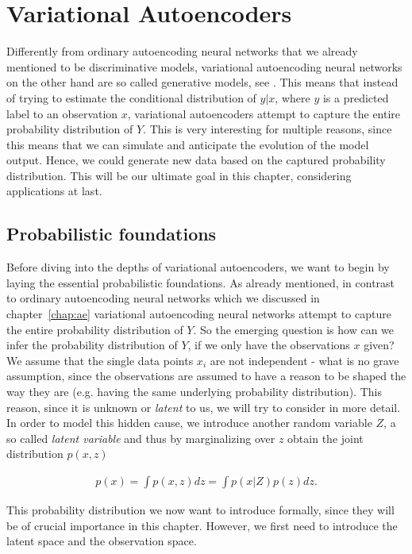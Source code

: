 \chapter{Variational Autoencoders}\label{chap:vae}

Differently from ordinary autoencoding neural networks that we already mentioned to be discriminative models, variational autoencoding neural networks on the other hand are so called generative models, see \cite[chapter~5]{cinelli2021variational}. This means that instead of trying to estimate the conditional distribution of $y|x$, where $y$ is a predicted label to an observation $x$, variational autoencoders attempt to capture the entire probability distribution of $Y$. This is very interesting for multiple reasons, since this means that we can simulate and anticipate the evolution of the model output. Hence, we could generate new data based on the captured probability distribution. This will be our ultimate goal in this chapter, considering applications at last.

\section{Probabilistic foundations}

Before diving into the depths of variational autoencoders, we want to begin by laying the essential probabilistic foundations. As already mentioned, in contrast to ordinary autoencoding neural networks which we discussed in chapter~\ref{chap:ae}
variational autoencoding neural networks attempt to capture the entire probability distribution of $Y$. So the emerging question is how can we infer the probability distribution of $Y$, if we only have the observations $x$ given? We assume that the single data points $x_i$ are not independent - what is no grave assumption, since the observations are assumed to have a reason to be shaped the way they are (e.g. having the same underlying probability distribution). This reason, since it is unknown or \textit{latent} to us, we will try to consider in more detail. In order to model this hidden cause, we introduce another random variable $Z$, a so called \textit{latent variable} and thus by marginalizing over $z$ obtain the joint distribution $p(x,z)$

\begin{align}\label{eq:evidence}
p(x) = \int p(x,z) dz = \int p(x|Z)p(z)dz.
\end{align}

This probability distribution we now want to introduce formally, since they will be of crucial importance in this chapter. However, we first need to introduce the latent space and the observation space.

